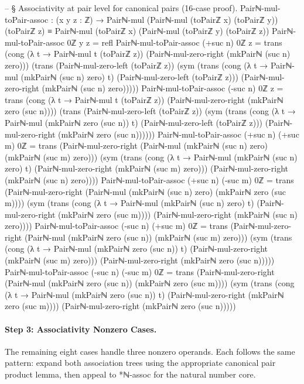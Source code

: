 \documentclass[11pt,a4paper]{book}
\def\texttt#1{#1}%
\begin{document}
\begin{code}
-- § Associativity at pair level for canonical pairs (16-case proof).
Pairℕ-mul-toPair-assoc : (x y z : ℤ) →
  Pairℕ-mul (Pairℕ-mul (toPairℤ x) (toPairℤ y)) (toPairℤ z)
    ≡
  Pairℕ-mul (toPairℤ x) (Pairℕ-mul (toPairℤ y) (toPairℤ z))
Pairℕ-mul-toPair-assoc 0ℤ y z = refl
Pairℕ-mul-toPair-assoc (+suc n) 0ℤ z =
  trans
    (cong (λ t → Pairℕ-mul t (toPairℤ z)) (Pairℕ-mul-zero-right (mkPairℕ (suc n) zero)))
    (trans
      (Pairℕ-mul-zero-left (toPairℤ z))
      (sym
        (trans
          (cong (λ t → Pairℕ-mul (mkPairℕ (suc n) zero) t) (Pairℕ-mul-zero-left (toPairℤ z)))
          (Pairℕ-mul-zero-right (mkPairℕ (suc n) zero)))))
Pairℕ-mul-toPair-assoc (-suc n) 0ℤ z =
  trans
    (cong (λ t → Pairℕ-mul t (toPairℤ z)) (Pairℕ-mul-zero-right (mkPairℕ zero (suc n))))
    (trans
      (Pairℕ-mul-zero-left (toPairℤ z))
      (sym
        (trans
          (cong (λ t → Pairℕ-mul (mkPairℕ zero (suc n)) t) (Pairℕ-mul-zero-left (toPairℤ z)))
          (Pairℕ-mul-zero-right (mkPairℕ zero (suc n))))))
Pairℕ-mul-toPair-assoc (+suc n) (+suc m) 0ℤ =
  trans
    (Pairℕ-mul-zero-right (Pairℕ-mul (mkPairℕ (suc n) zero) (mkPairℕ (suc m) zero)))
    (sym
      (trans
        (cong (λ t → Pairℕ-mul (mkPairℕ (suc n) zero) t) (Pairℕ-mul-zero-right (mkPairℕ (suc m) zero)))
        (Pairℕ-mul-zero-right (mkPairℕ (suc n) zero))))
Pairℕ-mul-toPair-assoc (+suc n) (-suc m) 0ℤ =
  trans
    (Pairℕ-mul-zero-right (Pairℕ-mul (mkPairℕ (suc n) zero) (mkPairℕ zero (suc m))))
    (sym
      (trans
        (cong (λ t → Pairℕ-mul (mkPairℕ (suc n) zero) t) (Pairℕ-mul-zero-right (mkPairℕ zero (suc m))))
        (Pairℕ-mul-zero-right (mkPairℕ (suc n) zero))))
Pairℕ-mul-toPair-assoc (-suc n) (+suc m) 0ℤ =
  trans
    (Pairℕ-mul-zero-right (Pairℕ-mul (mkPairℕ zero (suc n)) (mkPairℕ (suc m) zero)))
    (sym
      (trans
        (cong (λ t → Pairℕ-mul (mkPairℕ zero (suc n)) t) (Pairℕ-mul-zero-right (mkPairℕ (suc m) zero)))
        (Pairℕ-mul-zero-right (mkPairℕ zero (suc n)))))
Pairℕ-mul-toPair-assoc (-suc n) (-suc m) 0ℤ =
  trans
    (Pairℕ-mul-zero-right (Pairℕ-mul (mkPairℕ zero (suc n)) (mkPairℕ zero (suc m))))
    (sym
      (trans
        (cong (λ t → Pairℕ-mul (mkPairℕ zero (suc n)) t) (Pairℕ-mul-zero-right (mkPairℕ zero (suc m))))
        (Pairℕ-mul-zero-right (mkPairℕ zero (suc n)))))
\end{code}

\paragraph{Step 3: Associativity Nonzero Cases.}
The remaining eight cases handle three nonzero operands. Each follows the
same pattern: expand both association trees using the appropriate canonical
pair product lemma, then appeal to \texttt{*ℕ-assoc} for the natural number
core.
\end{document}
